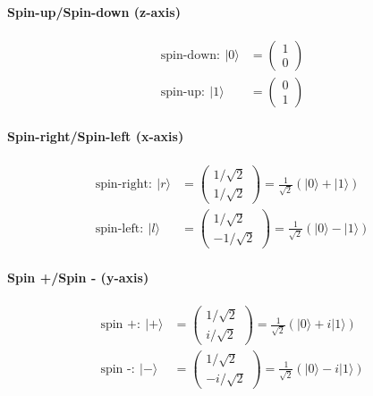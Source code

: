 \documentclass[11pt]{article}
\begin{document}
    \hypertarget{spin-upspin-down-z-axis}{%
\paragraph{Spin-up/Spin-down (z-axis)}\label{spin-upspin-down-z-axis}}

\begin{align}
\text{spin-down}: \ |0\rangle &= \begin{pmatrix} 1\\0 \end{pmatrix} \\
\text{spin-up}: \ |1\rangle & = \begin{pmatrix} 0\\1 \end{pmatrix}
\end{align}

    \hypertarget{spin-rightspin-left-x-axis}{%
\paragraph{Spin-right/Spin-left
(x-axis)}\label{spin-rightspin-left-x-axis}}

\begin{align}
\text{spin-right}: \ |r\rangle &= \begin{pmatrix} 1/\sqrt{2} \\ 1/\sqrt{2} \end{pmatrix} = \frac{1}{\sqrt{2}} \left(|0\rangle + |1\rangle\right) \\
\text{spin-left}: \ |l\rangle & = \begin{pmatrix} 1/\sqrt{2} \\ -1/\sqrt{2} \end{pmatrix} = \frac{1}{\sqrt{2}} \left(|0\rangle - |1\rangle\right)
\end{align}

    \hypertarget{spin-spin---y-axis}{%
\paragraph{Spin +/Spin - (y-axis)}\label{spin-spin---y-axis}}

\begin{align}
\text{spin +}: \ |+\rangle &= \begin{pmatrix} 1/\sqrt{2} \\ i/\sqrt{2} \end{pmatrix} = \frac{1}{\sqrt{2}} \left(|0\rangle + i|1\rangle\right) \\
\text{spin -}: \ |-\rangle & = \begin{pmatrix} 1/\sqrt{2} \\ -i/\sqrt{2} \end{pmatrix} = \frac{1}{\sqrt{2}} \left(|0\rangle - i|1\rangle\right)
\end{align}
\end{document}
